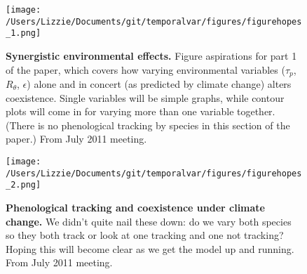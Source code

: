 \documentclass[11pt,a4paper,oneside]{article}
\begin{document}
\newpage
\begin{figure}[h!]
\centering
\noindent \texttt{[image: /Users/Lizzie/Documents/git/temporalvar/figures/figurehopes\_1.png]}
\caption{{\bf Synergistic environmental effects.}  Figure aspirations
  for part 1 of the paper, which covers how varying environmental
  variables (\(\tau_{p}\), \(R_{\theta}\), \(\epsilon\)) alone and in concert (as predicted by climate change)
  alters coexistence. Single variables will be simple graphs, while
  contour plots will come in for varying more than one variable
  together. (There is no phenological tracking by species in this
  section of the paper.) From July 2011 meeting.}
\end{figure}

\newpage
\begin{figure}[h!]
\centering
\noindent \texttt{[image: /Users/Lizzie/Documents/git/temporalvar/figures/figurehopes\_2.png]}
\caption{{\bf Phenological tracking and coexistence under climate
    change.}  We didn't quite nail these down: do we vary both species
so they both track or look at one tracking and one not tracking?
Hoping this will become clear as we get the model up and running. From July 2011 meeting.}
\end{figure}
\end{document}
